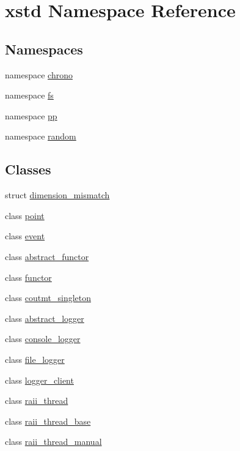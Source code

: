 \hypertarget{namespacexstd}{\section{xstd Namespace Reference}
\label{namespacexstd}
}
\subsection*{Namespaces}
\begin{DoxyCompactItemize}
\item 
namespace \hyperlink{namespacexstd_1_1chrono}{chrono}
\item 
namespace \hyperlink{namespacexstd_1_1fs}{fs}
\item 
namespace \hyperlink{namespacexstd_1_1pp}{pp}
\item 
namespace \hyperlink{namespacexstd_1_1random}{random}
\end{DoxyCompactItemize}
\subsection*{Classes}
\begin{DoxyCompactItemize}
\item 
struct \hyperlink{structxstd_1_1dimension__mismatch}{dimension\-\_\-mismatch}
\item 
class \hyperlink{classxstd_1_1point}{point}
\item 
class \hyperlink{classxstd_1_1event}{event}
\item 
class \hyperlink{classxstd_1_1abstract__functor}{abstract\-\_\-functor}
\item 
class \hyperlink{classxstd_1_1functor}{functor}
\item 
class \hyperlink{classxstd_1_1coutmt__singleton}{coutmt\-\_\-singleton}
\item 
class \hyperlink{classxstd_1_1abstract__logger}{abstract\-\_\-logger}
\item 
class \hyperlink{classxstd_1_1console__logger}{console\-\_\-logger}
\item 
class \hyperlink{classxstd_1_1file__logger}{file\-\_\-logger}
\item 
class \hyperlink{classxstd_1_1logger__client}{logger\-\_\-client}
\item 
class \hyperlink{classxstd_1_1raii__thread}{raii\-\_\-thread}
\item 
class \hyperlink{classxstd_1_1raii__thread__base}{raii\-\_\-thread\-\_\-base}
\item 
class \hyperlink{classxstd_1_1raii__thread__manual}{raii\-\_\-thread\-\_\-manual}
\end{DoxyCompactItemize}
